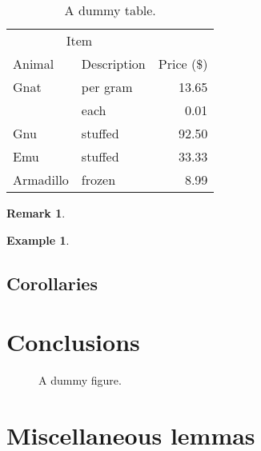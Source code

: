 \documentclass{etna}
\newtheorem{remark}[theorem]{Remark}
\newtheorem{example}[theorem]{Example}
\begin{document}
\begin{table}
\centering
\caption{A dummy table.}
\begin{tabular}{llr}
\toprule
\multicolumn{2}{c}{Item} \\
\cmidrule(r){1-2}
Animal    & Description & Price (\$) \\
\midrule
Gnat      & per gram    & 13.65      \\
          & each        & 0.01       \\
Gnu       & stuffed     & 92.50      \\
Emu       & stuffed     & 33.33      \\
Armadillo & frozen      & 8.99       \\
\bottomrule
\end{tabular}
\end{table}

\begin{remark}\upshape
  \lipsum[4]
\end{remark}
\begin{example}
  \lipsum[5]
\end{example}
\subsection{Corollaries}
\begin{corollary}
  \lipsum[6]
\end{corollary}
\begin{lemma}
  \lipsum[27]
\end{lemma}

\section{Conclusions}
\lipsum[10-12]

\begin{figure}
  \caption{A dummy figure.}
\end{figure}

\appendix

\section{Miscellaneous lemmas}
\lipsum[13-15]



\end{document}
